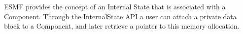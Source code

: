 %


ESMF provides the concept of an Internal State that is associated with
a Component. Through the InternalState API a user can attach a private
data block to a Component, and later retrieve a pointer to this memory
allocation.
